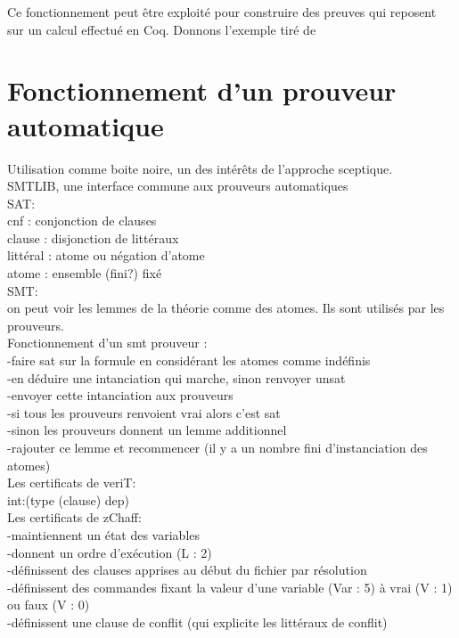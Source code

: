 \documentclass{article}
\begin{document}
Ce fonctionnement peut être exploité pour construire des preuves qui reposent sur un calcul effectué en Coq. Donnons l'exemple tiré de 


\section{Fonctionnement d'un prouveur automatique}

Utilisation comme boite noire, un des intérêts de l'approche sceptique.\\


SMTLIB, une interface commune aux prouveurs automatiques\\

SAT: \\
cnf : conjonction de clauses \\ 
clause : disjonction de littéraux \\
littéral : atome ou négation d'atome \\
atome : ensemble (fini?) fixé \\

SMT: \\
on peut voir les lemmes de la théorie comme des atomes. Ils sont utilisés par les prouveurs. \\
Fonctionnement d'un smt prouveur :\\
-faire sat sur la formule en considérant les atomes comme indéfinis \\
-en déduire une intanciation qui marche, sinon renvoyer unsat \\
-envoyer cette intanciation aux prouveurs \\
-si tous les prouveurs renvoient vrai alors c'est sat \\
-sinon les prouveurs donnent un lemme additionnel \\
-rajouter ce lemme et recommencer (il y a un nombre fini d'instanciation des atomes)\\ 

Les certificats de veriT:\\
int:(type (clause) dep) \\


Les certificats de zChaff:\\
-maintiennent un état des variables \\
-donnent un ordre d'exécution (L : 2) \\
-définissent des clauses apprises au début du fichier par résolution \\
-définissent des commandes fixant la valeur d'une variable (Var : 5) à vrai (V : 1) ou faux (V : 0) \\
-définissent une clause de conflit (qui explicite les littéraux de conflit)\\
\end{document}
